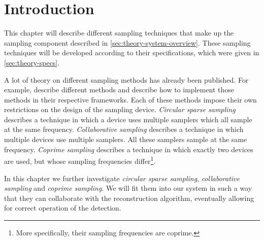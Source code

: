 \documentclass[a4paper, openany, oneside]{memoir}
\begin{document}
\section{Introduction}
This chapter will describe different sampling techniques that make up the sampling component described in \cref{sec:theory-system-overview}. These sampling techniques will be developed according to their specifications, which were given in \cref{sec:theory-specs}.

A lot of theory on different sampling methods has already been published. For example, \cite{ariananda2012compressive,ariananda2014cooperative,pal2011coprime} describe different methods and describe how to implement those methods in their respective frameworks. Each of these methods impose their own restrictions on the design of the sampling device. \textit{Circular sparse sampling} \cite{ariananda2012compressive} describes a technique in which a device uses multiple samplers which all sample at the same frequency. \textit{Collaborative sampling} \cite{ariananda2014cooperative} describes a technique in which multiple devices use multiple samplers. All these samplers sample at the same frequency. \textit{Coprime sampling} describes a technique in which exactly two devices are used, but whose sampling frequencies differ\footnote{More specifically, their sampling frequencies are coprime.}.

In this chapter we further investigate \textit{circular sparse sampling}, \textit{collaborative sampling} and \textit{coprime sampling}. We will fit them into our system in such a way that they can collaborate with the reconstruction algorithm, eventually allowing for correct operation of the detection. 


\end{document}

